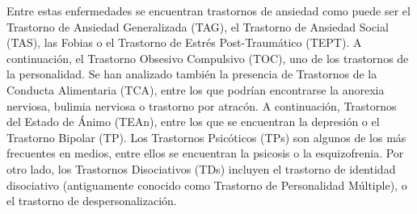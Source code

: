 \documentclass[12pt, a4paper,twoside,titlepage]{book}
\begin{document}
    Entre estas enfermedades se encuentran trastornos de ansiedad como puede ser el Trastorno de Ansiedad Generalizada (TAG), el Trastorno de Ansiedad Social (TAS), las Fobias o el Trastorno de Estrés Post-Traumático (TEPT). A continuación, el Trastorno Obsesivo Compulsivo (TOC), uno de los trastornos de la personalidad. Se han analizado también la presencia de Trastornos de la Conducta Alimentaria (TCA), entre los que podrían encontrarse la anorexia nerviosa, bulimia nerviosa o trastorno por atracón. A continuación, Trastornos del Estado de Ánimo (TEAn), entre los que se encuentran la depresión o el Trastorno Bipolar (TP). Los Trastornos Psicóticos (TPs) son algunos de los más frecuentes en medios, entre ellos se encuentran la psicosis o la esquizofrenia. Por otro lado, los Trastornos Disociativos (TDs) incluyen el trastorno de identidad disociativo (antiguamente conocido como Trastorno de Personalidad Múltiple), o el trastorno de despersonalización. 
    
\end{document}
